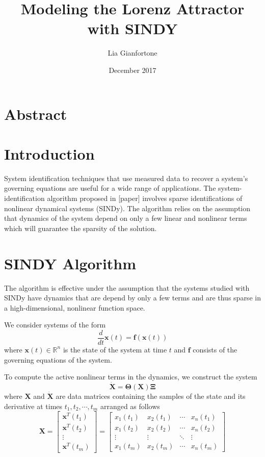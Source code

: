 \documentclass[12pt,preprintnumbers,amsmath,amssymb,titlepage]{report}
\begin{document}
\title{Modeling the Lorenz Attractor with SINDY}
\author{Lia Gianfortone}
\date{December 2017}

\maketitle


\section*{Abstract}

\section*{Introduction}

System identification techniques that use measured data to recover a system's governing equations are useful for a wide range of applications. The system-identification algorithm proposed in [paper] involves sparse identifications of nonlinear dynamical systems (SINDy). The algorithm relies on the assumption that dynamics of the system depend on only a few linear and nonlinear terms which will guarantee the sparsity of the solution. 


\section*{SINDY Algorithm}
The algorithm is effective under the assumption that the systems studied with SINDy have dynamics that are depend by only a few terms and are thus sparse in a high-dimensional, nonlinear function space. 

We consider systems of the form 
\begin{equation}
\frac{d}{dt}\bm{x}(t) = \bm{f}(\bm{x}(t))
\end{equation}
where $\bm{x}(t) \in \mathbb{R}^n$ is the state of the system at time $t$ and $\bm{f}$ consists of the governing equations of the system. 

To compute the active nonlinear terms in the dynamics, we construct the system 
\begin{equation} \label{eqn:main}
	\bm{\dot{X}} = \bm{\Theta}(\bm{X})\bm{\Xi}
\end{equation}
where $\bm{X}$ and $\bm{\dot{X}}$ are data matrices containing the samples of the state and its derivative at times $t_1, t_2, \cdots, t_m$ arranged as follows
\begin{equation*}
	\bm{X} = \begin{bmatrix} 
				\bm{x}^T(t_1) \\ \bm{x}^T(t_2) \\ \vdots \\ \bm{x}^T(t_m)
			\end{bmatrix}
		   = \begin{bmatrix}
		   		x_1(t_1) & x_2(t_1) & \cdots & x_n(t_1) \\
		   		x_1(t_2) & x_2(t_2) & \cdots & x_n(t_2) \\
		   		\vdots   & \vdots   & \ddots & \vdots   \\
		   		x_1(t_m) & x_2(t_m) & \cdots & x_n(t_m) 
	   		\end{bmatrix}
\end{equation*}
\end{document}
